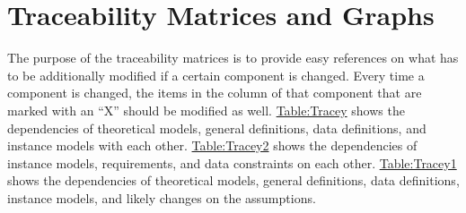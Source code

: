 \documentclass[12pt]{article}
\begin{document}
\section{Traceability Matrices and Graphs}
\label{Sec:TraceMatrices}
The purpose of the traceability matrices is to provide easy references on what has to be additionally modified if a certain component is changed. Every time a component is changed, the items in the column of that component that are marked with an ``X'' should be modified as well. \hyperref[Table:Tracey]{Table:Tracey} shows the dependencies of theoretical models, general definitions, data definitions, and instance models with each other. \hyperref[Table:Tracey2]{Table:Tracey2} shows the dependencies of instance models, requirements, and data constraints on each other. \hyperref[Table:Tracey1]{Table:Tracey1} shows the dependencies of theoretical models, general definitions, data definitions, instance models, and likely changes on the assumptions.
\end{document}
